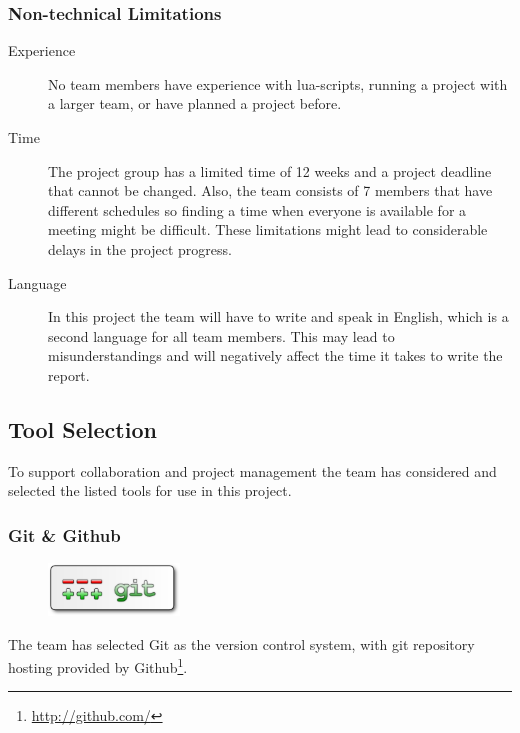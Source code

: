 \subsubsection{Non-technical Limitations}
\begin{description}
	\item[Experience] No team members have experience with \Gls{lua}-\glspl{script},
		running a project with a larger team, or have planned a project before.
	\item[Time] The project group has a limited time of 12 weeks and a project
		deadline that cannot be changed. Also, the team consists of 7 members
		that have different schedules so finding a time when everyone is
		available for a meeting might be difficult. These limitations might
		lead to considerable delays in the project progress.
	\item[Language] In this project the team will have to write and speak in
		English, which is a second language for all team members. This may
		lead to misunderstandings and will negatively affect the time it
		takes to write the report.
\end{description}

\subsection{Tool Selection}
To support collaboration and project management the team has considered and
selected the listed tools for use in this project.

\subsubsection{Git \& Github}
\begin{figure}
	\vspace{-20pt}
	\includegraphics[width=3.5cm]{./planning/img/git_logo}
	\vspace{-20pt}
\end{figure}
The team has selected Git as the \gls{version control system}, with git \gls{repository}
hosting provided by Github\footnote{\url{http://github.com/}}.

